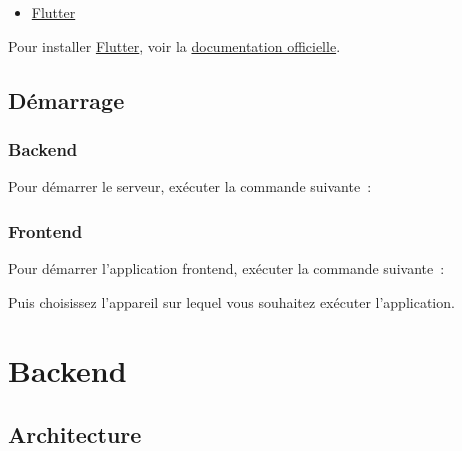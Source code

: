 \begin{itemize}
\tightlist
\item
  \href{https://flutter.dev/}{Flutter}
\end{itemize}

Pour installer \href{https://flutter.dev/}{Flutter}, voir la
\href{https://flutter.dev/docs/get-started/install}{documentation
officielle}.

\subsection{Démarrage}\label{duxe9marrage}

\subsubsection{Backend}\label{backend-1}

Pour démarrer le serveur, exécuter la commande suivante~:

\begin{Shaded}
\begin{Highlighting}[]
\end{Highlighting}
\end{Shaded}

\subsubsection{Frontend}\label{frontend-1}

Pour démarrer l'application frontend, exécuter la commande suivante~:

\begin{Shaded}
\begin{Highlighting}[]
\end{Highlighting}
\end{Shaded}

Puis choisissez l'appareil sur lequel vous souhaitez exécuter
l'application.

\section{Backend}\label{backend-2}

\subsection{Architecture}\label{architecture}

